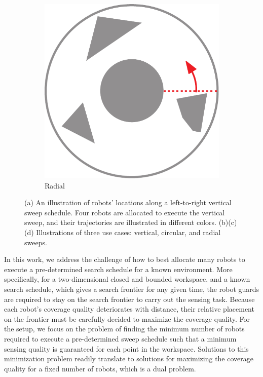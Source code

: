 \begin{figure}[t]
    \begin{subfigure}[t]{0.2\textwidth}
         \centering
         \includegraphics[width=\textwidth]{chapters/sc/fig/rotational-eps-converted-to.pdf}
         \caption{Radial}
         \label{fig:sc-circular}
    \end{subfigure}
     
    \vspace{2mm}
    \caption[Illustration of sweep schedules]{(a) An illustration of robots' locations along a left-to-right 
    vertical sweep schedule. Four robots are allocated to execute the vertical sweep, 
    and their trajectories are illustrated in different colors. 
    (b)(c)(d) Illustrations of three use cases: vertical, circular, 
    and radial sweeps.}
    \label{fig:sc-sweep}
\end{figure}

In this work, we address the challenge of how to best allocate 
many robots to execute a pre-determined search schedule for a known environment. 
More specifically, for a two-dimensional closed and bounded workspace, and a known 
search schedule, which gives a search frontier for any given time, the robot guards 
are required to stay on the search frontier to carry out the sensing task. 
%
Because each robot's coverage quality deteriorates with distance, their relative 
placement on the frontier must be carefully decided to maximize the coverage quality. 
%
For the setup, we focus on the problem of finding the minimum number of robots required 
to execute a pre-determined sweep schedule such that a minimum sensing quality is 
guaranteed for each point in the workspace. Solutions to this minimization problem 
readily translate to solutions for maximizing the coverage quality for a fixed number 
of robots, which is a dual problem. 

